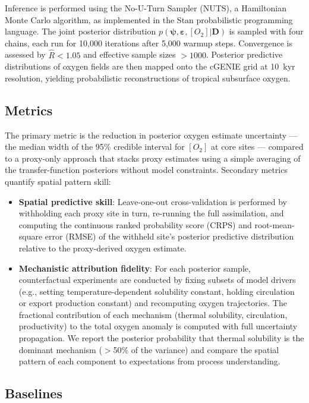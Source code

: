 \documentclass{article}
\begin{document}
Inference is performed using the No-U-Turn Sampler (NUTS), a Hamiltonian Monte Carlo algorithm, as implemented in the Stan probabilistic programming language.
The joint posterior distribution $p(\boldsymbol{\psi}, \boldsymbol{\varepsilon}, [O_2] | \mathbf{D})$ is sampled with four chains, each run for 10,000 iterations after 5,000 warmup steps.
Convergence is assessed by $\widehat{R} < 1.05$ and effective sample sizes $>1000$.
Posterior predictive distributions of oxygen fields are then mapped onto the cGENIE grid at 10~kyr resolution, yielding probabilistic reconstructions of tropical subsurface oxygen.

\subsection{Metrics}

The primary metric is the reduction in posterior oxygen estimate uncertainty — the median width of the 95\% credible interval for $[O_2]$ at core sites — compared to a proxy-only approach that stacks proxy estimates using a simple averaging of the transfer-function posteriors without model constraints.
Secondary metrics quantify spatial pattern skill:
\begin{itemize}
    \item \textbf{Spatial predictive skill}: Leave-one-out cross-validation is performed by withholding each proxy site in turn, re-running the full assimilation, and computing the continuous ranked probability score (CRPS) and root-mean-square error (RMSE) of the withheld site’s posterior predictive distribution relative to the proxy-derived oxygen estimate.
    \item \textbf{Mechanistic attribution fidelity}: For each posterior sample, counterfactual experiments are conducted by fixing subsets of model drivers (e.g., setting temperature-dependent solubility constant, holding circulation or export production constant) and recomputing oxygen trajectories. The fractional contribution of each mechanism (thermal solubility, circulation, productivity) to the total oxygen anomaly is computed with full uncertainty propagation. We report the posterior probability that thermal solubility is the dominant mechanism ($>$50\% of the variance) and compare the spatial pattern of each component to expectations from process understanding.
\end{itemize}

\subsection{Baselines}
\end{document}

